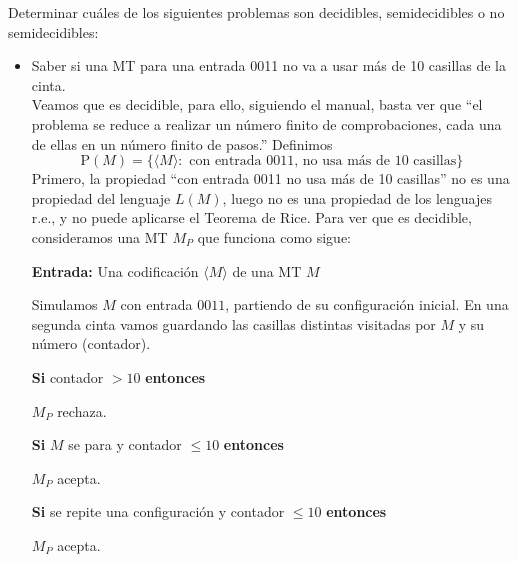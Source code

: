 \begin{ejercicio}\label{ejercicio:ej18}
    Determinar cuáles de los siguientes problemas son decidibles, semidecidibles o no semidecidibles:
    \begin{itemize}
        \item[a)] Saber si una MT para una entrada 0011 no va a usar más de 10 casillas de la cinta.\\
        
        Veamos que es decidible, para ello, siguiendo el manual, basta ver que ``el problema se reduce a realizar un número
        finito de comprobaciones, cada una de ellas en un número finito de pasos.'' Definimos 
        $$\text{P}(M) = \{\langle M \rangle : \text{ con entrada 0011, no usa más de 10 casillas}\}$$
        Primero, la propiedad ``con entrada 0011 no usa más de 10 casillas'' no es una propiedad
        del lenguaje $L(M)$, luego no es una propiedad de los lenguajes r.e., y no puede aplicarse el Teorema de Rice. Para ver que es decidible, 
        consideramos una MT $M_{P}$ que funciona como sigue:
        \begin{algorithm}
            \caption{MT $M_{P}$}
            \label{algorithm:parada0011-decidible}
            \begin{algorithmic}
                \State \textbf{Entrada:} Una codificación $\langle M \rangle$ de una MT $M$

                \State Simulamos $M$ con entrada $0011$, partiendo de su configuración inicial.
                \State En una segunda cinta vamos guardando las casillas distintas visitadas por $M$ y su número (contador).

                \State \hspace{1cm} \textbf{Si} contador $ > 10$ \textbf{entonces}

                \State \hspace{2cm} $M_P$ rechaza.

                \State \hspace{1cm} \textbf{Si} $M$ se para y contador $\leq 10$ \textbf{entonces}

                \State \hspace{2cm} $M_P$ acepta.

                \State \hspace{1cm} \textbf{Si} se repite una configuración y contador $\leq 10$ \textbf{entonces}

                \State \hspace{2cm} $M_P$ acepta.
            \end{algorithmic}
        \end{algorithm}


\end{itemize}
\end{ejercicio}
